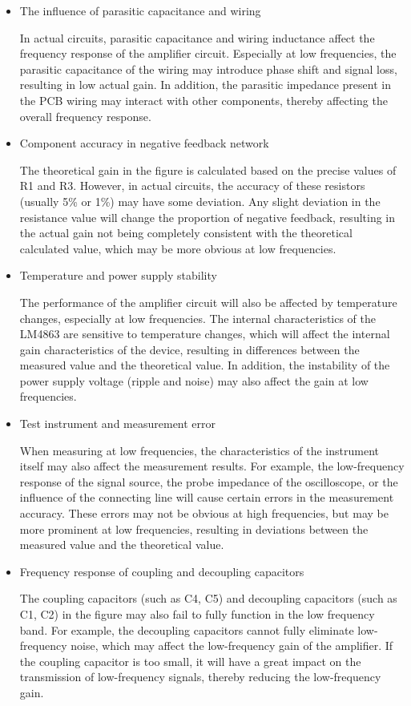 \begin{enumerate}
\begin{itemize}
		\item The influence of parasitic capacitance and wiring
		
		In actual circuits, parasitic capacitance and wiring inductance affect the frequency response of the amplifier circuit. Especially at low frequencies, the parasitic capacitance of the wiring may introduce phase shift and signal loss, resulting in low actual gain. In addition, the parasitic impedance present in the PCB wiring may interact with other components, thereby affecting the overall frequency response.
		
		\item Component accuracy in negative feedback network
		
		The theoretical gain in the figure is calculated based on the precise values ​​of R1 and R3. However, in actual circuits, the accuracy of these resistors (usually 5\% or 1\%) may have some deviation. Any slight deviation in the resistance value will change the proportion of negative feedback, resulting in the actual gain not being completely consistent with the theoretical calculated value, which may be more obvious at low frequencies.
		
		\item Temperature and power supply stability
		
		The performance of the amplifier circuit will also be affected by temperature changes, especially at low frequencies. The internal characteristics of the LM4863 are sensitive to temperature changes, which will affect the internal gain characteristics of the device, resulting in differences between the measured value and the theoretical value. In addition, the instability of the power supply voltage (ripple and noise) may also affect the gain at low frequencies.
		
		\item Test instrument and measurement error
		
		When measuring at low frequencies, the characteristics of the instrument itself may also affect the measurement results. For example, the low-frequency response of the signal source, the probe impedance of the oscilloscope, or the influence of the connecting line will cause certain errors in the measurement accuracy. These errors may not be obvious at high frequencies, but may be more prominent at low frequencies, resulting in deviations between the measured value and the theoretical value.
		
		\item Frequency response of coupling and decoupling capacitors
		
		The coupling capacitors (such as C4, C5) and decoupling capacitors (such as C1, C2) in the figure may also fail to fully function in the low frequency band. For example, the decoupling capacitors cannot fully eliminate low-frequency noise, which may affect the low-frequency gain of the amplifier. If the coupling capacitor is too small, it will have a great impact on the transmission of low-frequency signals, thereby reducing the low-frequency gain.
	\end{itemize}
	
\end{enumerate}

